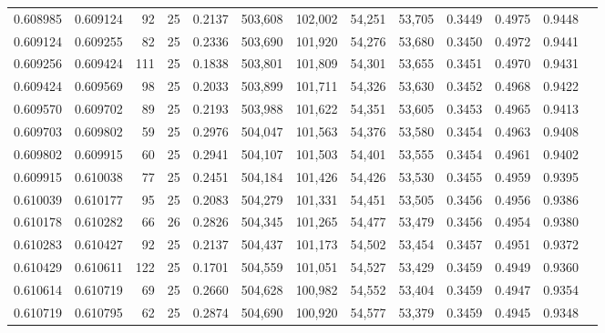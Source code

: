 \begin{tabular}{rrrrrrrrrrrrr}
0.608985 & 0.609124 &    92 &  25 &                                     0.2137 & 503,608 & 102,002 &  54,251 &  53,705 & 0.3449 & 0.4975 & 0.9448 \\
0.609124 & 0.609255 &    82 &  25 &                                     0.2336 & 503,690 & 101,920 &  54,276 &  53,680 & 0.3450 & 0.4972 & 0.9441 \\
0.609256 & 0.609424 &   111 &  25 &                                     0.1838 & 503,801 & 101,809 &  54,301 &  53,655 & 0.3451 & 0.4970 & 0.9431 \\
0.609424 & 0.609569 &    98 &  25 &                                     0.2033 & 503,899 & 101,711 &  54,326 &  53,630 & 0.3452 & 0.4968 & 0.9422 \\
0.609570 & 0.609702 &    89 &  25 &                                     0.2193 & 503,988 & 101,622 &  54,351 &  53,605 & 0.3453 & 0.4965 & 0.9413 \\
0.609703 & 0.609802 &    59 &  25 &                                     0.2976 & 504,047 & 101,563 &  54,376 &  53,580 & 0.3454 & 0.4963 & 0.9408 \\
0.609802 & 0.609915 &    60 &  25 &                                     0.2941 & 504,107 & 101,503 &  54,401 &  53,555 & 0.3454 & 0.4961 & 0.9402 \\
0.609915 & 0.610038 &    77 &  25 &                                     0.2451 & 504,184 & 101,426 &  54,426 &  53,530 & 0.3455 & 0.4959 & 0.9395 \\
0.610039 & 0.610177 &    95 &  25 &                                     0.2083 & 504,279 & 101,331 &  54,451 &  53,505 & 0.3456 & 0.4956 & 0.9386 \\
0.610178 & 0.610282 &    66 &  26 &                                     0.2826 & 504,345 & 101,265 &  54,477 &  53,479 & 0.3456 & 0.4954 & 0.9380 \\
0.610283 & 0.610427 &    92 &  25 &                                     0.2137 & 504,437 & 101,173 &  54,502 &  53,454 & 0.3457 & 0.4951 & 0.9372 \\
0.610429 & 0.610611 &   122 &  25 &                                     0.1701 & 504,559 & 101,051 &  54,527 &  53,429 & 0.3459 & 0.4949 & 0.9360 \\
0.610614 & 0.610719 &    69 &  25 &                                     0.2660 & 504,628 & 100,982 &  54,552 &  53,404 & 0.3459 & 0.4947 & 0.9354 \\
0.610719 & 0.610795 &    62 &  25 &                                     0.2874 & 504,690 & 100,920 &  54,577 &  53,379 & 0.3459 & 0.4945 & 0.9348 \\

\end{tabular}
